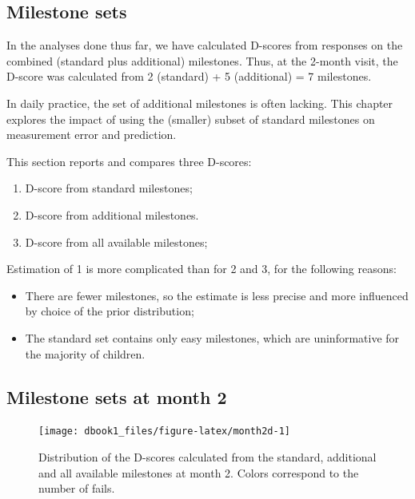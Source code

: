 \documentclass[
]{book}
\providecommand{\tightlist}{%
  \setlength{\itemsep}{0pt}\setlength{\parskip}{0pt}}
\begin{document}
\hypertarget{milestone-sets}{%
\subsection{Milestone sets}\label{milestone-sets}}

In the analyses done thus far, we have calculated D-scores from responses on the combined (standard plus additional) milestones. Thus, at the 2-month visit, the D-score was calculated from 2 (standard) + 5 (additional) = 7 milestones.

In daily practice, the set of additional milestones is often lacking. This chapter explores the impact of using the (smaller) subset of standard milestones on measurement error and prediction.

This section reports and compares three D-scores:

\begin{enumerate}
\def\labelenumi{\arabic{enumi}.}
\tightlist
\item
  D-score from standard milestones;
\item
  D-score from additional milestones.
\item
  D-score from all available milestones;
\end{enumerate}

Estimation of 1 is more complicated than for 2 and 3, for the following reasons:

\begin{itemize}
\item
  There are fewer milestones, so the estimate is less precise and more influenced by choice of the prior distribution;
\item
  The standard set contains only easy milestones, which are uninformative for the majority of children.
\end{itemize}

\hypertarget{milestone-sets-at-month-2}{%
\subsection{Milestone sets at month 2}\label{milestone-sets-at-month-2}}

\begin{figure}

{\centering \texttt{[image: dbook1\_files/figure-latex/month2d-1]} 

}

\caption{Distribution of the D-scores calculated from the standard, additional and all available milestones at month 2. Colors correspond to the number of fails.}\label{fig:month2d}
\end{figure}
\end{document}
